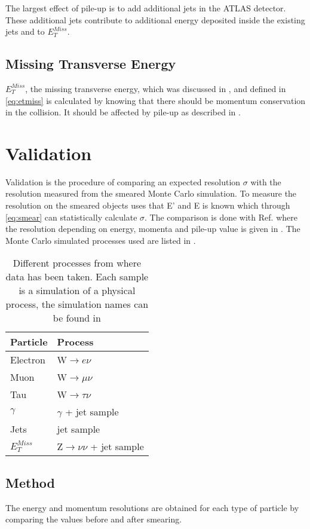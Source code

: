 The largest effect of pile-up is to add additional jets in the ATLAS detector. These additional jets contribute to additional energy deposited inside the existing jets and to $E^{Miss}_T$.
\subsection{Missing Transverse Energy}
$E_T^{Miss}$, the missing transverse energy, which was discussed in , and defined in \eqref{eq:etmiss} is calculated by knowing that there should be momentum conservation in the collision. It should be affected by pile-up as described in .

\newpage
\section{Validation}\label{sec:vali}
Validation is the procedure of comparing an expected resolution $\sigma$ with the resolution measured from the smeared Monte Carlo simulation. To measure the resolution on the smeared objects uses that E' and E is known which through \eqref{eq:smear} can statistically calculate $\sigma$. The comparison is done with Ref. \citep{ATL-PHYS-PUB-2013-004} where the resolution depending on energy, momenta and pile-up value is given in . The Monte Carlo simulated processes used are listed in . 

\begin{SCtable}[][ht]
\begin{tabular}{|l|l|}
\hline
Particle & Process \\ \hline
Electron & W$\rightarrow e\nu$ \\
Muon & W$\rightarrow \mu \nu$ \\
Tau & W$\rightarrow \tau \nu$ \\
$\gamma$ & $\gamma$ + jet sample \\
Jets & jet sample \\
$E_T^{Miss}$ & Z$\rightarrow \nu \nu$ + jet sample \\ \hline
\end{tabular}
\caption{Different processes from where data has been taken. Each sample is a simulation of a physical process, the simulation names can be found in }
\label{tab:backproc}
\end{SCtable}

\subsection{Method}
The energy and momentum resolutions are obtained for each type of particle by comparing the values before and after smearing.


